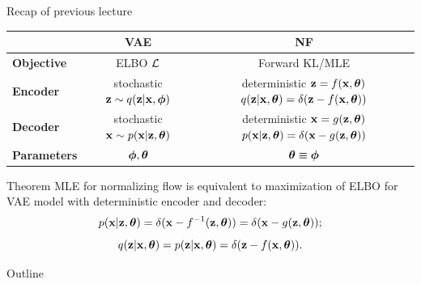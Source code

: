 \begin{frame}{Recap of previous lecture}
	\begin{table}[]
		\begin{tabular}{l|c|c}
			& \textbf{VAE} & \textbf{NF} \\ \hline
			\textbf{Objective} & ELBO $\mathcal{L}$ & Forward KL/MLE \\ \hline
			\textbf{Encoder} & \shortstack{stochastic \\ $\mathbf{z} \sim q (\mathbf{z} | \mathbf{x}, \boldsymbol{\phi})$} &  \shortstack{\\ deterministic \\ $\mathbf{z} = f(\mathbf{x}, \boldsymbol{\theta})$ \\ $q(\mathbf{z} | \mathbf{x}, \boldsymbol{\theta}) = \delta(\mathbf{z} - f(\mathbf{x}, \boldsymbol{\theta}))$}  \\ \hline
			\textbf{Decoder} & \shortstack{stochastic \\ $\mathbf{x} \sim p (\mathbf{x} | \mathbf{z}, \boldsymbol{\theta})$} & \shortstack{\\ deterministic \\ $\mathbf{x} = g(\mathbf{z}, \boldsymbol{\theta})$ \\ $ p(\mathbf{x} | \mathbf{z}, \boldsymbol{\theta}) = \delta(\mathbf{x} - g(\mathbf{z}, \boldsymbol{\theta}))$} \\ \hline
			\textbf{Parameters}  & $\boldsymbol{\phi}, \boldsymbol{\theta}$ & $\boldsymbol{\theta} \equiv \boldsymbol{\phi}$\\ 
		\end{tabular}
	\end{table}
	\begin{block}{Theorem}
		MLE for normalizing flow is equivalent to maximization of ELBO for VAE model with deterministic encoder and decoder:
		\vspace{-0.3cm}
		\[
		p(\mathbf{x} | \mathbf{z}, \boldsymbol{\theta}) = \delta (\mathbf{x} - f^{-1}(\mathbf{z}, \boldsymbol{\theta})) = \delta (\mathbf{x} - g(\mathbf{z}, \boldsymbol{\theta}));
		\]
		\[
		q(\mathbf{z} | \mathbf{x}, \boldsymbol{\theta}) = p(\mathbf{z} | \mathbf{x}, \boldsymbol{\theta}) = \delta (\mathbf{z} - f(\mathbf{x}, \boldsymbol{\theta})).
		\]
	\end{block}
\end{frame}
\begin{frame}{Outline}
	\tableofcontents
\end{frame}
